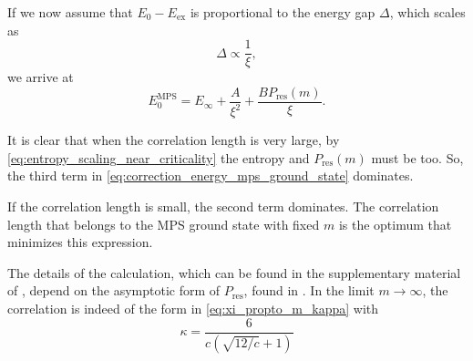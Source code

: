 If we now assume that $E_0 - E_{\text{ex}}$ is proportional to the energy gap $\Delta$, which scales as \cite{lieb1961two, mata1989energy, pfeuty1970one}
\begin{equation}
  \Delta \propto \frac{1}{\xi},
\end{equation}
we arrive at
\begin{equation}\label{eq:correction_energy_mps_ground_state}
  E_{0}^{\text{MPS}} = E_{\infty} + \frac{A}{\xi^2} + \frac{B P_{\text{res}}(m)}{\xi}.
\end{equation}

It is clear that when the correlation length is very large, by \autoref{eq:entropy_scaling_near_criticality} the entropy
and $P_{\text{res}}(m)$ must be too.
So, the third term in \autoref{eq:correction_energy_mps_ground_state} dominates.

If the correlation length is small, the second term dominates.
The correlation length that belongs to the MPS ground state with fixed $m$ is the optimum that minimizes this
expression.

The details of the calculation, which can be found in the supplementary material of \cite{pollmann2009theory},
depend on the asymptotic form of $P_{\text{res}}$, found in \cite{calabrese2008entanglement}. In the limit $m \to \infty$, the correlation is indeed of the form in \autoref{eq:xi_propto_m_kappa} with
\begin{equation}
  \kappa = \frac{6}{c \left( \sqrt{12/c} + 1 \right) }
\end{equation}










